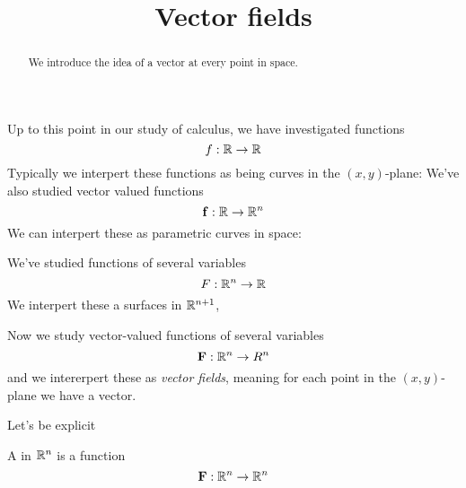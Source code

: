 \documentclass{ximera}
\title[Dig-In:]{Vector fields}
\begin{document}
\begin{abstract}
  We introduce the idea of a vector at every point in space. 
\end{abstract}
\maketitle

Up to this point in our study of calculus, we have investigated functions
\[
f:\mathbb R \to \mathbb R
\]
Typically we interpert these functions as being curves in the $(x,y)$-plane:
We've also studied vector valued functions
\[
\mathbf{f}:\mathbb R \to \mathbb R^n
\]
We can interpert these as parametric curves in space:

We've studied functions of several variables
\[
F:\mathbb R^n \to \mathbb R
\]
We interpert these a surfaces in $\mathbb R^{n+1}$,


Now we study vector-valued functions of several variables
\[
\mathbf{F}:\mathbb R^n\to R^n
\]
and we intererpert these as \textit{vector fields}, meaning for each
point in the $(x,y)$-plane we have a vector.

Let's be explicit
\begin{definition}
  A  in $\mathbb R^n$ is a function
  \[
  \mathbf{F}: \mathbb R^n\to\mathbb R^n
  \]
\end{definition}
\end{document}
